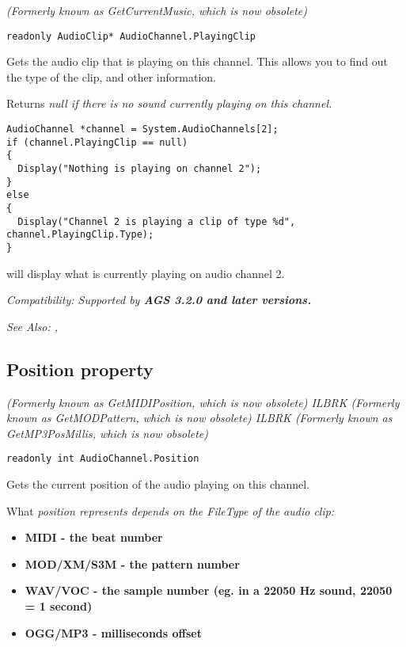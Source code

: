 \it{(Formerly known as GetCurrentMusic, which is now obsolete)}

\begin{verbatim}
readonly AudioClip* AudioChannel.PlayingClip
\end{verbatim}
Gets the audio clip that is playing on this channel. This allows you to find out the type
of the clip, and other information.

Returns \it{null} if there is no sound currently playing on this channel.

\begin{verbatim}
AudioChannel *channel = System.AudioChannels[2];
if (channel.PlayingClip == null)
{
  Display("Nothing is playing on channel 2");
}
else
{
  Display("Channel 2 is playing a clip of type %d", channel.PlayingClip.Type);
}
\end{verbatim}
will display what is currently playing on audio channel 2.

\it{Compatibility:} Supported by \bf{AGS 3.2.0} and later versions.

\it{See Also:} , 


\subsection{Position property}\label{AudioChannel.Position}%

\it{(Formerly known as GetMIDIPosition, which is now obsolete)} ILBRK
\it{(Formerly known as GetMODPattern, which is now obsolete)} ILBRK
\it{(Formerly known as GetMP3PosMillis, which is now obsolete)}

\begin{verbatim}
readonly int AudioChannel.Position
\end{verbatim}
Gets the current position of the audio playing on this channel.

What \it{position} represents depends on the FileType of the audio clip:
\begin{itemize}
\item \bf{MIDI} - the beat number
\item \bf{MOD/XM/S3M} - the pattern number
\item \bf{WAV/VOC} - the sample number (eg. in a 22050 Hz sound, 22050 = 1 second)
\item \bf{OGG/MP3} - milliseconds offset
\end{itemize}


